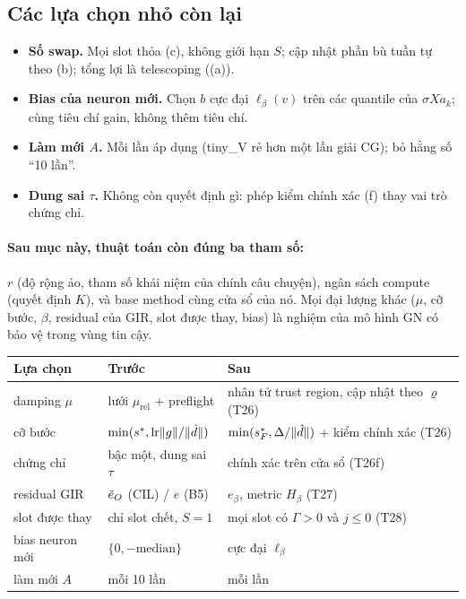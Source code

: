 \subsection{Các lựa chọn nhỏ còn lại}

\begin{itemize}
\item \textbf{Số swap.} Mọi slot thỏa (c), không giới hạn $S$; cập nhật phần bù tuần tự theo (b); tổng lợi là telescoping ((a)).
\item \textbf{Bias của neuron mới.} Chọn $b$ cực đại $\ell_\beta(v)$ trên các quantile của $\sigma Xa_k$; cùng tiêu chí gain, không thêm tiêu chí.
\item \textbf{Làm mới $A$.} Mỗi lần áp dụng (tiny\_V rẻ hơn một lần giải CG); bỏ hằng số ``10 lần''.
\item \textbf{Dung sai $\tau$.} Không còn quyết định gì: phép kiểm chính xác (f) thay vai trò chứng chỉ.
\end{itemize}

\paragraph{Sau mục này, thuật toán còn đúng ba tham số:} $r$ (độ rộng ảo, tham số khái niệm của chính câu chuyện), ngân sách compute (quyết định $K$), và base method cùng cửa sổ của nó. Mọi đại lượng khác ($\mu$, cỡ bước, $\beta$, residual của GIR, slot được thay, bias) là nghiệm của mô hình GN có bảo vệ trong vùng tin cậy.

\begin{tabularx}{\linewidth}{@{}lXl@{}}
\toprule
Lựa chọn & Trước & Sau \\
\midrule
damping $\mu$ & lưới $\mu_{\mathrm{rel}}$ + preflight & nhân tử trust region, cập nhật theo $\varrho$ (T26) \\
cỡ bước & $\min(s^*,\mathrm{lr}\lVert g\rVert/\lVert \hat d\rVert)$ & $\min(s_F^*,\Delta/\lVert \hat d\rVert)$ + kiểm chính xác (T26) \\
chứng chỉ & bậc một, dung sai $\tau$ & chính xác trên cửa sổ (T26f) \\
residual GIR & $\tilde e_O$ (CIL) / $e$ (B5) & $e_\beta$, metric $H_\beta$ (T27) \\
slot được thay & chỉ slot chết, $S=1$ & mọi slot có $\Gamma>0$ và $j\le0$ (T28) \\
bias neuron mới & $\{0,-\mathrm{median}\}$ & cực đại $\ell_\beta$ \\
làm mới $A$ & mỗi 10 lần & mỗi lần \\
\bottomrule
\end{tabularx}
